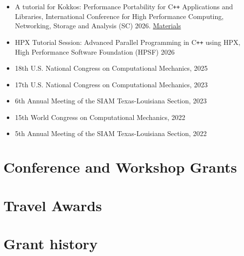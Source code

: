 \documentclass[11pt,a4paper,sans]{moderncv}
\begin{document}
\begin{itemize}[leftmargin=4cm]
\item A tutorial for Kokkos: Performance Portability for C\texttt{++} Applications and Libraries,  International Conference for High Performance Computing, Networking, Storage and Analysis (SC) 2026. \href{https://zenodo.org/records/24119536}{Materials}
\item HPX Tutorial Session: Advanced Parallel Programming in C\texttt{++} using HPX, High Performance Software Foundation (HPSF) 2026
\end{itemize}

\begin{itemize}[leftmargin=4cm]
\item 18th U.S. National Congress on Computational Mechanics, 2025
\item 17th U.S. National Congress on Computational Mechanics, 2023
\item 6th Annual Meeting of the SIAM Texas-Louisiana Section, 2023
\item 15th World Congress on Computational Mechanics, 2022
\item 5th Annual Meeting of the SIAM Texas-Louisiana Section, 2022
\end{itemize}

\section{Conference and Workshop Grants}

\section{Travel Awards}
\section{Grant history}
\end{document}
